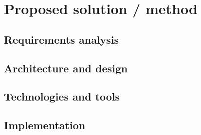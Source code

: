 \chapter{Proposed solution / method}
\label{ch:method}


\section{Requirements analysis}

\section{Architecture and design}

\section{Technologies and tools}

\section{Implementation}
